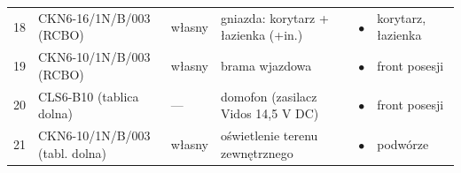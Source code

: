 \documentclass[10pt,a4paper,landscape]{article}
\begin{document}
\begin{center}
\begin{tabular}{@{}c l l l c l@{}}
18 & CKN6-16/1N/B/003 (RCBO) & własny & gniazda: korytarz + łazienka (+in.) & \textcolor{cGN}{$\bullet$} & korytarz, łazienka\\
19 & CKN6-10/1N/B/003 (RCBO) & własny & brama wjazdowa & \textcolor{cSPEC}{$\bullet$} & front posesji\\
20 & CLS6-B10 (tablica dolna) & --- & domofon (zasilacz Vidos 14,5 V DC) & \textcolor{cSPEC}{$\bullet$} & front posesji\\
21 & CKN6-10/1N/B/003 (tabl. dolna) & własny & oświetlenie terenu zewnętrznego & \textcolor{cSPEC}{$\bullet$} & podwórze\\
\bottomrule
\end{tabular}
\end{center}
\newpage
\par\vspace{1mm}
\end{document}
